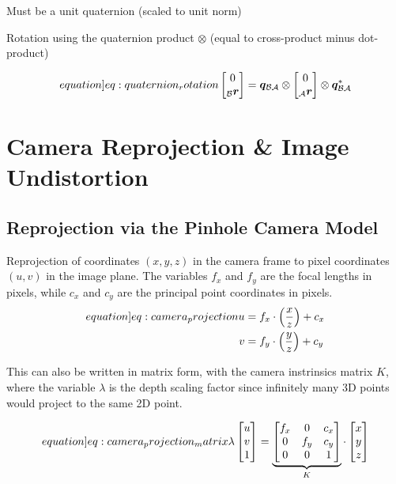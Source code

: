 Must be a unit quaternion (scaled to unit norm)

Rotation using the quaternion product $\otimes$ (equal to cross-product minus dot-product)

\begin{equation}
    \label[equation]{eq:quaternion_rotation}
    \begin{bmatrix} 0 \\ _\mathcal B \vec r \end{bmatrix} = \vec q_{\mathcal B \mathcal A} \otimes \begin{bmatrix} 0 \\ _\mathcal A \vec r \end{bmatrix} \otimes \vec q_{\mathcal B \mathcal A}^*
\end{equation}

\section{Camera Reprojection \& Image Undistortion}

\subsection{Reprojection via the Pinhole Camera Model}

Reprojection of coordinates $(x,y,z)$ in the camera frame to pixel coordinates $(u,v)$ in the image plane. The variables $f_x$ and $f_y$ are the focal lengths in pixels, while $c_x$ and $c_y$ are the principal point coordinates in pixels.
\begin{align}
    \label[equation]{eq:camera_projection}
    u &= f_x \cdot \Big(\frac{x}{z}\Big) + c_x \\
    v &= f_y \cdot \Big(\frac{y}{z}\Big) + c_y
\end{align}

This can also be written in matrix form, with the camera instrinsics matrix $K$, where the variable $\lambda$ is the depth scaling factor since infinitely many 3D points would project to the same 2D point.

\begin{equation}
    \label[equation]{eq:camera_projection_matrix}
    \lambda \begin{bmatrix} u \\ v \\ 1 \end{bmatrix} = \underbrace{\begin{bmatrix} f_x & 0 & c_x\\ 0 & f_y & c_y \\ 0 & 0 & 1 \end{bmatrix}}_K \cdot \begin{bmatrix} x \\ y \\ z \end{bmatrix}
\end{equation}


